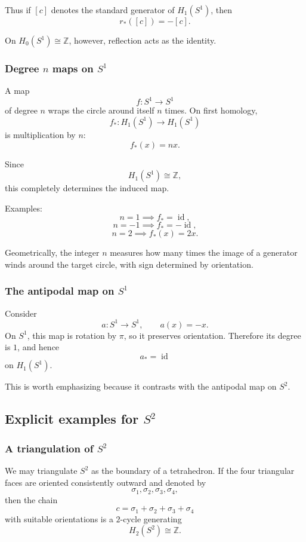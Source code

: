 \documentclass[12pt,a4paper]{article}
\theoremstyle{notespace}
\begin{document}
Thus if \([c]\) denotes the standard generator of \(H_1(S^1)\), then
\[
r_*([c])=-[c].
\]

On \(H_0(S^1)\cong \mathbb{Z}\), however, reflection acts as the identity.

\subsubsection{Degree \texorpdfstring{$n$}{n} maps on \texorpdfstring{$S^1$}{S1}}

A map
\[
f:S^1\to S^1
\]
of degree \(n\) wraps the circle around itself \(n\) times. On first homology,
\[
f_*:H_1(S^1)\to H_1(S^1)
\]
is multiplication by \(n\):
\[
f_*(x)=nx.
\]

Since
\[
H_1(S^1)\cong \mathbb{Z},
\]
this completely determines the induced map.

Examples:
\[
n=1 \implies f_*=\operatorname{id},
\]
\[
n=-1 \implies f_*=-\operatorname{id},
\]
\[
n=2 \implies f_*(x)=2x.
\]

Geometrically, the integer \(n\) measures how many times the image of a generator winds around the target circle, with sign determined by orientation.

\subsubsection{The antipodal map on \texorpdfstring{$S^1$}{S1}}

Consider
\[
a:S^1\to S^1,\qquad a(x)=-x.
\]
On \(S^1\), this map is rotation by \(\pi\), so it preserves orientation. Therefore its degree is \(1\), and hence
\[
a_*=\operatorname{id}
\]
on \(H_1(S^1)\).

This is worth emphasizing because it contrasts with the antipodal map on \(S^2\).

\subsection{Explicit examples for \texorpdfstring{$S^2$}{S2}}

\subsubsection{A triangulation of \texorpdfstring{$S^2$}{S2}}

We may triangulate \(S^2\) as the boundary of a tetrahedron. If the four triangular faces are oriented consistently outward and denoted by
\[
\sigma_1,\sigma_2,\sigma_3,\sigma_4,
\]
then the chain
\[
c=\sigma_1+\sigma_2+\sigma_3+\sigma_4
\]
with suitable orientations is a \(2\)-cycle generating
\[
H_2(S^2)\cong \mathbb{Z}.
\]
\end{document}
